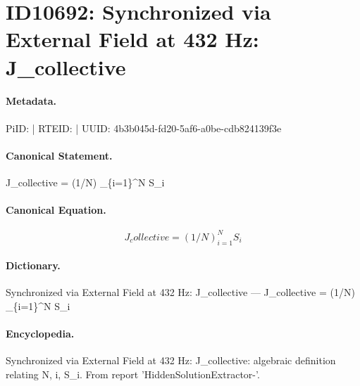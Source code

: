 \section*{ID10692: Synchronized via External Field at 432 Hz: J\_collective}
\paragraph{Metadata.}
PiID:  | RTEID:  | UUID: 4b3b045d-fd20-5af6-a0be-cdb824139f3e

\paragraph{Canonical Statement.}
J\_collective = (1/N) \_\{i=1\}\textasciicircum{}N S\_i

\paragraph{Canonical Equation.}
\[
J_collective = (1/N)  _{i=1}^N S_i
\]

\paragraph{Dictionary.}
Synchronized via External Field at 432 Hz: J\_collective — J\_collective = (1/N)  \_\{i=1\}\textasciicircum{}N S\_i

\paragraph{Encyclopedia.}
Synchronized via External Field at 432 Hz: J\_collective: algebraic definition relating N, i, S\_i. From report 'HiddenSolutionExtractor-'.
